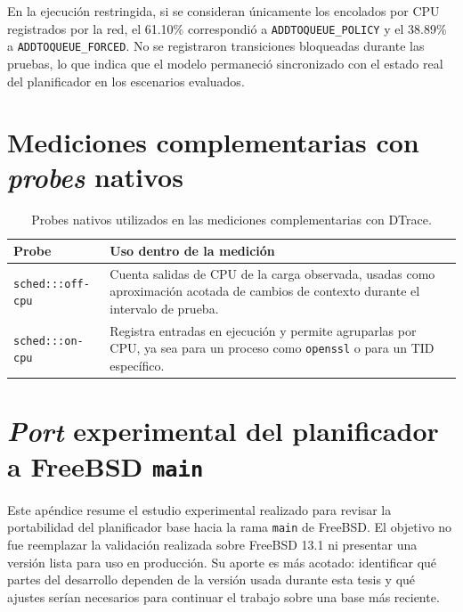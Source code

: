 En la ejecución restringida, si se consideran únicamente los encolados por CPU registrados por la red, el 61.10\% correspondió a \verb|ADDTOQUEUE_POLICY| y el 38.89\% a \verb|ADDTOQUEUE_FORCED|. No se registraron transiciones bloqueadas durante las pruebas, lo que indica que el modelo permaneció sincronizado con el estado real del planificador en los escenarios evaluados.\par

\chapter{Mediciones complementarias con \textit{probes} nativos}
\label{appendix:dtrace-native-measurements}

\begin{table}[H]
    \centering
    \begin{tabular}{|p{}|p{}|}
        \hline
        \textbf{Probe} & \textbf{Uso dentro de la medición} \\
        \hline
        \verb|sched:::off-cpu| & Cuenta salidas de CPU de la carga observada, usadas como aproximación acotada de cambios de contexto durante el intervalo de prueba. \\
        \hline
        \verb|sched:::on-cpu| & Registra entradas en ejecución y permite agruparlas por CPU, ya sea para un proceso como \verb|openssl| o para un TID específico. \\
        \hline
    \end{tabular}
    \caption{Probes nativos utilizados en las mediciones complementarias con DTrace.}
    \label{tabla:dtrace-native-probes}
\end{table}

\chapter{\textit{Port} experimental del planificador a FreeBSD \texttt{main}}\label{appendix:port-main}

Este apéndice resume el estudio experimental realizado para revisar la portabilidad del planificador base hacia la rama \texttt{main} de FreeBSD. El objetivo no fue reemplazar la validación realizada sobre FreeBSD 13.1 ni presentar una versión lista para uso en producción. Su aporte es más acotado: identificar qué partes del desarrollo dependen de la versión usada durante esta tesis y qué ajustes serían necesarios para continuar el trabajo sobre una base más reciente.\par

